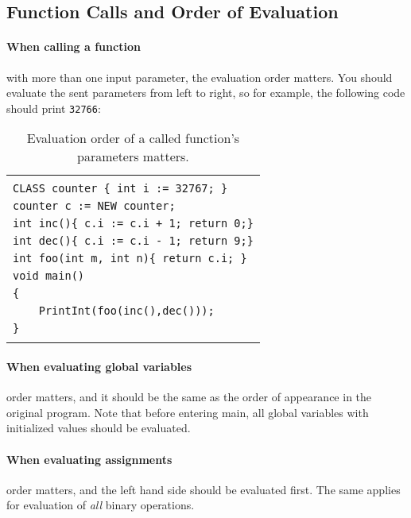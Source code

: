 \documentclass{article}
\begin{document}
\subsection{Function Calls and Order of Evaluation}
\label{subsection_Function_Calls_And_Order_Of_Evaluation}
\paragraph{When calling a function} with more than one input parameter,
the evaluation order matters. You should evaluate the sent parameters
from left to right, so for example, the following code should print \verb"32766":
\begin{table}[h]
\centering
\begin{tabular}{|l|}
\hline
                                               \\
\verb"CLASS counter { int i := 32767; }"       \\
\verb"counter c := NEW counter;"               \\
\verb"int inc(){ c.i := c.i + 1; return 0;}"   \\
\verb"int dec(){ c.i := c.i - 1; return 9;}"   \\
\verb"int foo(int m, int n){ return c.i; }"    \\
\verb"void main()"                             \\
\verb"{"                                       \\
\verb"    PrintInt(foo(inc(),dec()));"         \\
\verb"}"                                       \\
                                               \\
\hline
\end{tabular}
\caption{Evaluation order of a called function's parameters matters.
\label{Table_Code_Example_Evaluation_Order_Function_Call}}
\end{table}
\paragraph{When evaluating global variables}
\label{Paragraph_When_Evaluating_Global_Variables}
order matters,
and it should be the same as the order of appearance in the original program.
Note that before entering main, all global variables with initialized values
should be evaluated.
\paragraph{When evaluating assignments} order matters,
and the left hand side should be evaluated first.
The same applies for evaluation of \textit{all} binary operations.
\end{document}
